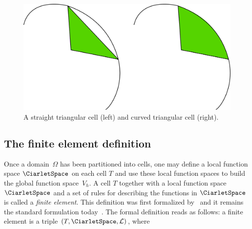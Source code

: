 \begin{figure}
  \begin{center}
    \includegraphics[width=\largefig]{chapters/kirby-7/pdf/straight_and_curved_triangles.pdf}
    \caption{A straight triangular cell (left) and curved triangular
      cell (right).}
    \label{fig:shapes,curved}
  \end{center}
\end{figure}

\subsection{The finite element definition}

Once a domain~$\Omega$ has been partitioned into cells, one may define
a local function space $\CiarletSpace$ on each cell $T$ and use these
local function spaces to build the global function space~$V_h$. A cell
$T$ together with a local function space $\CiarletSpace$ and a set of
rules for describing the functions in $\CiarletSpace$ is called a
\emph{finite element}. This definition was first
formalized by~\citet{Ciarlet1976} and it remains the standard
formulation today~\citep{BrennerScott2008}. The formal definition
reads as follows: a finite element is a triple $(T,
\CiarletSpace, \mathcal{L})$, where
\femdefinition{}

